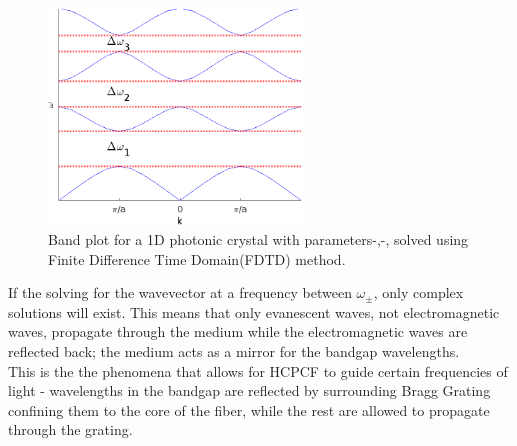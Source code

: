 \begin{figure}[h]
	\centering
	\includegraphics[width=0.6\textwidth]{./Figures/HCPCF/1D_BandGap.png}
	\caption {Band plot for a 1D photonic crystal with parameters-,-, solved using Finite Difference Time Domain(FDTD) method\cite{sukhoivanov}.}
	\label{fig:1dbp}
\end{figure}
If the solving for the wavevector at a frequency between $\omega_{\pm}$, only complex solutions will exist. This means that only evanescent waves, not electromagnetic waves, propagate through the medium while the electromagnetic waves are reflected back; the medium acts as a mirror for the bandgap wavelengths.\\
This is the the phenomena that allows for HCPCF to guide certain frequencies of light - wavelengths in the bandgap are reflected by surrounding Bragg Grating confining them to the core of the fiber, while the rest are allowed to propagate through the grating. 

